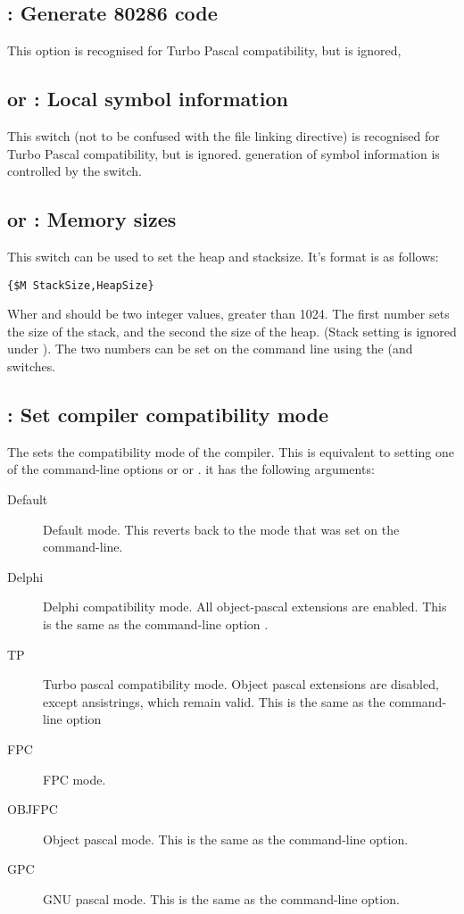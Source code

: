\documentclass{report}
\begin{document}
\subsection{ : Generate 80286 code}

This option is recognised for Turbo Pascal compatibility, but is ignored,

\subsection{ or : Local symbol information}

This switch (not to be confused with the  file linking
directive) is recognised for Turbo Pascal compatibility, but is ignored.
generation of symbol information is controlled by the  switch.

\subsection{ or : Memory sizes}

This switch can be used to set the heap and stacksize. It's format is as
follows:
\begin{verbatim}
{$M StackSize,HeapSize}
\end{verbatim}
Wher  and  should be two integer values,
greater than 1024. The first number sets the size of the stack, and the
second the size of the heap. (Stack setting is ignored under \linux).
The two numbers can be set on the command line using the 
(and  switches.

\subsection{ : Set compiler compatibility mode}

The  sets the compatibility mode of the compiler. This 
is equivalent to setting one of the command-line options  or
 or . it has the following arguments:
\begin{description}
\item[Default] Default mode. This reverts back to the mode that was set on
the command-line.
\item[Delphi] Delphi compatibility mode. All object-pascal extensions are
enabled. This is the same as the command-line option .
\item[TP] Turbo pascal compatibility mode. Object pascal extensions are
disabled, except ansistrings, which remain valid. This is the same as the command-line option 
\item[FPC] FPC mode. 
\item[OBJFPC] Object pascal mode. This is the same as the 
command-line option.
\item[GPC] GNU pascal mode. This is the same as the  command-line
option.
\end{description}
\end{document}
